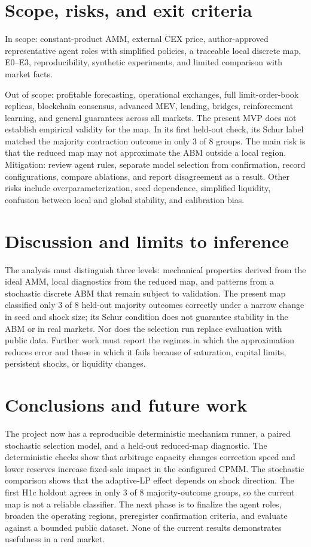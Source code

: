 \section{Scope, risks, and exit criteria}

In scope: constant-product AMM, external CEX price, author-approved representative agent
roles with simplified policies, a traceable local discrete map, E0--E3, reproducibility, synthetic experiments,
and limited comparison with market facts.

Out of scope: profitable forecasting, operational exchanges, full limit-order-book
replicas, blockchain consensus, advanced MEV, lending, bridges, reinforcement
learning, and general guarantees across all markets. The present MVP does not establish
empirical validity for the map. In its first held-out check, its Schur label matched the
majority contraction outcome in only 3 of 8 groups. The main risk is that the reduced
map may not approximate the ABM outside a local region. Mitigation: review agent rules,
separate model selection from confirmation, record configurations, compare ablations,
and report disagreement as a result. Other risks include overparameterization, seed
dependence, simplified liquidity, confusion between local and global stability, and
calibration bias.

\section{Discussion and limits to inference}

The analysis must distinguish three levels: mechanical properties derived from the
ideal AMM, local diagnostics from the reduced map, and patterns from a stochastic
discrete ABM that remain subject to validation. The present map classified only 3 of 8
held-out majority outcomes correctly under a narrow change in seed and shock size; its
Schur condition does not guarantee stability in the ABM or in real markets. Nor does
the selection run replace evaluation with public data. Further work must report the
regimes in which the approximation reduces error and those in which it fails because
of saturation, capital limits, persistent shocks, or liquidity changes.

\section{Conclusions and future work}

The project now has a reproducible deterministic mechanism runner, a paired
stochastic selection model, and a held-out reduced-map diagnostic. The deterministic
checks show that arbitrage capacity changes correction speed and lower reserves
increase fixed-sale impact in the configured CPMM. The stochastic comparison shows
that the adaptive-LP effect depends on shock direction. The first H1c holdout agrees in
only 3 of 8 majority-outcome groups, so the current map is not a reliable classifier.
The next phase is to finalize the agent roles, broaden the operating regions, preregister
confirmation criteria, and evaluate against a bounded public dataset. None of the
current results demonstrates usefulness in a real market.
